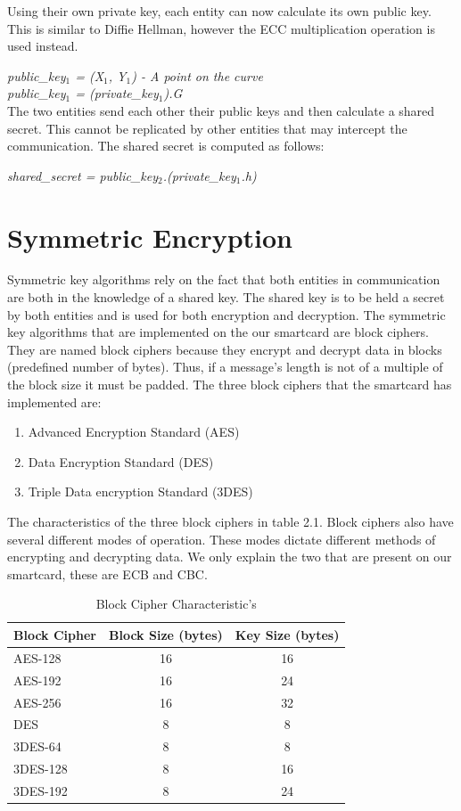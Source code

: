 \documentclass[bsc,frontabs,twoside,singlespacing,parskip,deptreport]{infthesis}     %
\begin{document}
Using their own private key, each entity can now calculate its own public key. This is similar to Diffie Hellman, however the ECC multiplication operation is used instead.

\textit{public\_key$_1$ = (X$_1$, Y$_1$) - A point on the curve}\\
\textit{public\_key$_1$ = (private\_key$_1$).G}\\

The two entities send each other their public keys and then calculate a shared secret. This cannot be replicated by other entities that may intercept the communication. The shared secret is computed as follows:
\begin{center}
\textit{shared\_secret = public\_key$_2$.(private\_key$_1$.h)}
\end{center}


\section{Symmetric Encryption}
Symmetric key algorithms rely on the fact that both entities in communication are both in the knowledge of a shared key. The shared key is to be held a secret by both entities and is used for both encryption and decryption. The symmetric key algorithms that are implemented on the our smartcard are block ciphers. They are named block ciphers because they encrypt and decrypt data in blocks (predefined number of bytes). Thus, if a message's length is not of a multiple of the block size it must be padded. The three block ciphers that the smartcard has implemented are:
\begin{enumerate}
\item Advanced Encryption Standard (AES)
\item Data Encryption Standard (DES)
\item Triple Data encryption Standard (3DES)\\
\end{enumerate}

The characteristics of the three block ciphers in table 2.1. Block ciphers also have several different modes of operation. These modes dictate different methods of encrypting and decrypting data. We only explain the two that are present on our smartcard, these are ECB and CBC.

\begin{table}[H]
\begin{tabular}{|l|c|c|}
\hline
Block Cipher & Block Size (bytes) & Key Size (bytes)\\
\hline
AES-128 & 16 & 16\\
AES-192 & 16 & 24\\
AES-256 & 16 & 32\\
\hline
DES & 8 & 8\\
\hline
3DES-64 & 8 & 8\\
3DES-128 & 8 & 16\\
3DES-192 & 8 & 24\\
\hline
\end{tabular}
\caption{Block Cipher Characteristic's}
\end{table}
\end{document}
